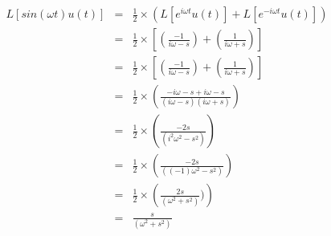 \documentclass{article}
\begin{document}
\begin{eqnarray}
L[sin(\omega t) u(t)] & = &\frac{1}{2}\times(L[e^{i\omega t} u(t)] + L[e^{-i\omega t} u(t)]) \\
&=& \frac{1}{2}\times \left[\left(\frac{-1}{i\omega-s}\right) + \left(\frac{1}{i\omega+s}\right)\right]\\
&=& \frac{1}{2}\times \left[\left(\frac{-1}{i\omega-s}\right) + \left(\frac{1}{i\omega+s}\right)\right] \\
&=& \frac{1}{2}\times \left(\frac{-i\omega-s + i\omega-s}{(i\omega-s)(i\omega+s)}\right) \\
&=& \frac{1}{2}\times \left(\frac{-2s}{(i^2\omega ^2 -s^2)}\right) \\
&=& \frac{1}{2}\times \left(\frac{-2s}{((-1)\omega ^2 -s^2)}\right) \\
&=& \frac{1}{2}\times \left(\frac{2s}{(\omega ^2 + s^2)})\right) \\
&=& \frac{s}{(\omega ^2 + s^2)}
\end{eqnarray}
\end{document}
